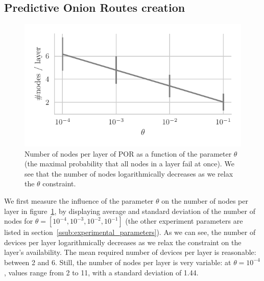 


\subsection{Predictive Onion Routes creation} %
\label{sub:predictive_onion_routes_creation}

\begin{figure}[t]
\centering
\includegraphics[width=0.8\columnwidth]{figures/nodes_per_layer_vs_theta.pdf}
\caption{\label{fig:nodes_per_layer_vs_theta}Number of nodes per layer of POR as a function of the parameter $\theta$ (the maximal probability that all nodes in a layer fail at once). We see that the number of nodes logarithmically decreases as we relax the $\theta$ constraint.}
\end{figure}

We first measure the influence of the parameter $\theta$ on the number of nodes per layer in figure~\ref{fig:nodes_per_layer_vs_theta}, by displaying average and standard deviation of the number of nodes for $\theta=[10^{-4}, 10^{-3}, 10^{-2}, 10^{-1}]$ (the other experiment parameters are listed in section~\ref{ssub:experimental_parameters}).
As we can see, the number of devices per layer logarithmically decreases as we relax the constraint on the layer's availability.
The mean required number of devices per layer is reasonable: between 2 and 6.
Still, the number of nodes per layer is very variable: at $\theta=10^{-4}$, values range from 2 to 11, with a standard deviation of 1.44. 

